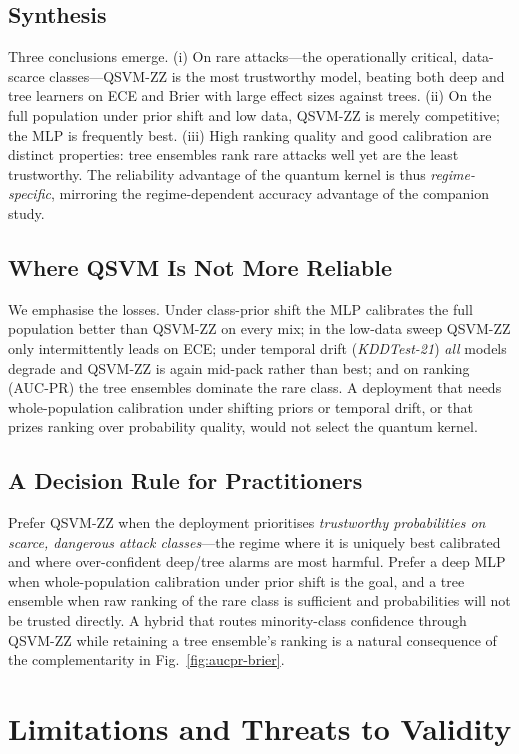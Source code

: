 \documentclass[journal]{IEEEtran}
\newcommand{\ZZ}{\textsc{ZZ}}
\newcommand{\QSVM}{QSVM-\ZZ}
\begin{document}
\subsection{Synthesis}
Three conclusions emerge. (i) On rare attacks---the operationally
critical, data-scarce classes---\QSVM{} is the most trustworthy model,
beating both deep and tree learners on ECE and Brier with large effect
sizes against trees. (ii) On the full population under prior shift and
low data, \QSVM{} is merely competitive; the MLP is frequently best.
(iii) High ranking quality and good calibration are distinct properties:
tree ensembles rank rare attacks well yet are the least trustworthy. The
reliability advantage of the quantum kernel is thus \emph{regime-specific},
mirroring the regime-dependent accuracy advantage of the companion study.

\subsection{Where QSVM Is Not More Reliable}
We emphasise the losses. Under class-prior shift the MLP calibrates the
full population better than \QSVM{} on every mix; in the low-data sweep
\QSVM{} only intermittently leads on ECE; under temporal drift
(\textit{KDDTest-21}) \emph{all} models degrade and \QSVM{} is again
mid-pack rather than best; and on ranking (AUC-PR) the tree ensembles
dominate the rare class. A deployment that needs whole-population
calibration under shifting priors or temporal drift, or that prizes
ranking over probability quality, would not select the quantum kernel.

\subsection{A Decision Rule for Practitioners}
Prefer \QSVM{} when the deployment prioritises \emph{trustworthy
probabilities on scarce, dangerous attack classes}---the regime where it
is uniquely best calibrated and where over-confident deep/tree alarms are
most harmful. Prefer a deep MLP when whole-population calibration under
prior shift is the goal, and a tree ensemble when raw ranking of the rare
class is sufficient and probabilities will not be trusted directly. A
hybrid that routes minority-class confidence through \QSVM{} while
retaining a tree ensemble's ranking is a natural consequence of the
complementarity in Fig.~\ref{fig:aucpr-brier}.

\section{Limitations and Threats to Validity}\label{sec:limits}
\end{document}
